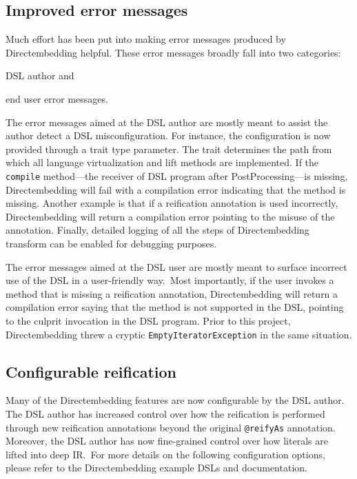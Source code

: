\subsection{Improved error messages} %
\label{sub:Improvederrormessages}
Much effort has been put into making error messages produced by Directembedding helpful.
These error messages broadly fall into two categories: 
\begin{inparaenum}[i)]
    \item DSL author and
    \item end user error messages.
\end{inparaenum}


The error messages aimed at the DSL author are mostly meant to assist the author detect a DSL misconfiguration.
For instance, the configuration is now provided through a trait type parameter.
The trait determines the path from which all language virtualization and lift methods are implemented.
If the \texttt{compile} method---the receiver of DSL program after PostProcessing---is missing, Directembedding will fail with a compilation error indicating that the method is missing.
Another example is that if a reification annotation is used incorrectly, Directembedding will return a compilation error pointing to the misuse of the annotation.
Finally, detailed logging of all the steps of Directembedding transform can be enabled for debugging purposes.

The error messages aimed at the DSL user are mostly meant to surface incorrect use of the DSL in a user-friendly way.\
Most importantly, if the user invokes a method that is missing a reification annotation, Directembedding will return a compilation error saying that the method is not supported in the DSL, pointing to the culprit invocation in the DSL program.
Prior to this project, Directembedding threw a cryptic \texttt{EmptyIteratorException} in the same situation.

\subsection{Configurable reification} %
\label{sub:Configurablereification}
Many of the Directembedding features are now configurable by the DSL author.
The DSL author has increased control over how the reification is performed through new reification annotations beyond the original \texttt{@reifyAs} annotation.
Moreover, the DSL author has now fine-grained control over how literals are lifted into deep IR.\
For more details on the following configuration options, please refer to the Directembedding example DSLs and documentation.


